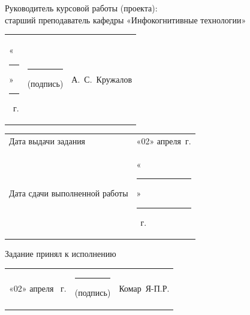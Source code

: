 \documentclass[14pt, a4paper]{extarticle}
\begin{document}

Руководитель курсовой работы (проекта): \\ старший преподаватель кафедры
«Инфокогнитивные технологии»

{
\renewcommand{\arraystretch}{2}
\noindent
\begin{tabularx}{\textwidth}{@{} P{0.45\textwidth} P{0.3\textwidth} P{0.25\textwidth} @{}}

    «\rule{0.8cm}{0.4pt}» \quad \rule{2cm}{0.4pt} ~г. &
    \centering \rule{3.5cm}{0.4pt} \par \footnotesize (подпись) &
    \hfill А.~С.~Кружалов                                         \\
\end{tabularx}

\begin{tabularx}{\textwidth}{@{} P{0.45\textwidth} P{0.55\textwidth} @{}}
    Дата выдачи задания           &
\hfill «02» \quad апреля~г. \\

    Дата сдачи выполненной работы &
    \hfill «\rule{0.8cm}{0.4pt}» \quad \rule{2cm}{0.4pt} ~г. \\
\end{tabularx}
}

Задание принял к исполнению

{
\renewcommand{\arraystretch}{1.5}
\begin{tabularx}{\textwidth}{@{} P{0.45\textwidth} P{0.3\textwidth} P{0.25\textwidth} @{}}

    «02» \quad апреля ~г. &
\centering \rule{3.5cm}{0.4pt} \par \footnotesize (подпись) &
\hfill Комар~Я-П.Р.                                           \\
\end{tabularx}
}
\end{document}
